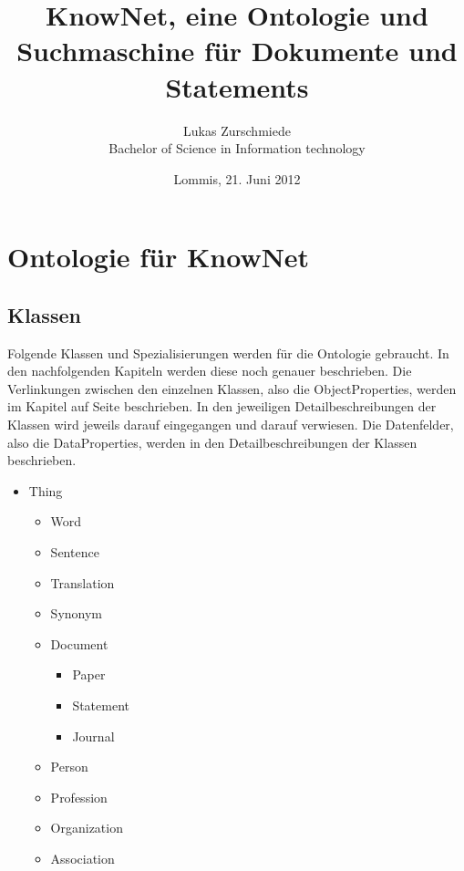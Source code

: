 \documentclass[
    11pt,
    latin1,
    a4paper,
    oneside
]{scrreprt}
\author{Lukas Zurschmiede\\Bachelor of Science in Information technology}
\date{Lommis, 21. Juni 2012}
\title{KnowNet, eine Ontologie und Suchmaschine f\"ur Dokumente und Statements}
\begin{document}
\maketitle

\newpage
\singlespacing
\tableofcontents

\pagebreak
\onehalfspacing
\setcounter{page}{1}

\chapter{Ontologie f\"ur KnowNet} \label{ontology}


\section{Klassen} \label{sec:class}

Folgende Klassen und Spezialisierungen werden f\"ur die Ontologie gebraucht. In den nachfolgenden Kapiteln werden diese noch genauer beschrieben. Die Verlinkungen zwischen den einzelnen Klassen, also die ObjectProperties, werden im Kapitel  auf Seite \pageref{sec:relations} beschrieben. In den jeweiligen Detailbeschreibungen der Klassen wird jeweils darauf eingegangen und darauf verwiesen. Die Datenfelder, also die DataProperties, werden in den Detailbeschreibungen der Klassen beschrieben.

\begin{itemize}
  \item Thing
  \begin{itemize}
    \item Word
    \item Sentence
    \item Translation
    \item Synonym
    \item Document
    \begin{itemize}
      \item Paper
      \item Statement
      \item Journal
    \end{itemize}
    \item Person
    \item Profession
    \item Organization
    \item Association
  \end{itemize} %
\end{itemize}
\end{document}
